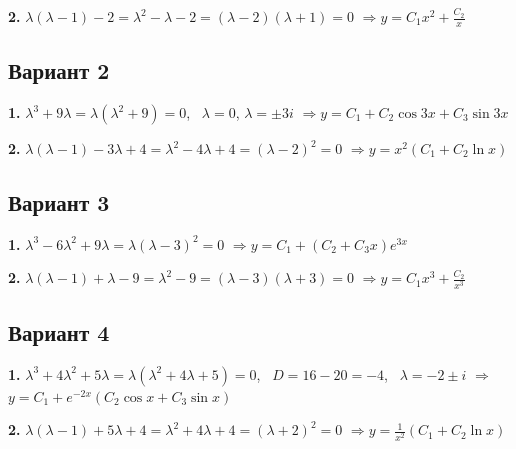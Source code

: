 \documentclass[11pt,a4paper]{article}
\begin{document}
\textbf{2.} $\lambda(\lambda - 1) - 2 = \lambda^2 - \lambda - 2 = (\lambda - 2)(\lambda + 1) = 0$ \quad$\Rightarrow$\quad $\displaystyle y = C_1 x^2 + \frac{C_2}{x}$

\subsection*{Вариант 2}

\textbf{1.} $\lambda^3 + 9\lambda = \lambda(\lambda^2 + 9) = 0$, \ $\lambda = 0$, $\lambda = \pm 3i$ \quad$\Rightarrow$\quad $\displaystyle y = C_1 + C_2\cos 3x + C_3\sin 3x$

\textbf{2.} $\lambda(\lambda - 1) - 3\lambda + 4 = \lambda^2 - 4\lambda + 4 = (\lambda - 2)^2 = 0$ \quad$\Rightarrow$\quad $\displaystyle y = x^2(C_1 + C_2\ln x)$

\subsection*{Вариант 3}

\textbf{1.} $\lambda^3 - 6\lambda^2 + 9\lambda = \lambda(\lambda - 3)^2 = 0$ \quad$\Rightarrow$\quad $\displaystyle y = C_1 + (C_2 + C_3 x)e^{3x}$

\textbf{2.} $\lambda(\lambda - 1) + \lambda - 9 = \lambda^2 - 9 = (\lambda - 3)(\lambda + 3) = 0$ \quad$\Rightarrow$\quad $\displaystyle y = C_1 x^3 + \frac{C_2}{x^3}$

\subsection*{Вариант 4}

\textbf{1.} $\lambda^3 + 4\lambda^2 + 5\lambda = \lambda(\lambda^2 + 4\lambda + 5) = 0$, \ $D = 16 - 20 = -4$, \ $\lambda = -2 \pm i$ \quad$\Rightarrow$\quad $\displaystyle y = C_1 + e^{-2x}(C_2\cos x + C_3\sin x)$

\textbf{2.} $\lambda(\lambda - 1) + 5\lambda + 4 = \lambda^2 + 4\lambda + 4 = (\lambda + 2)^2 = 0$ \quad$\Rightarrow$\quad $\displaystyle y = \frac{1}{x^2}(C_1 + C_2\ln x)$
\end{document}
